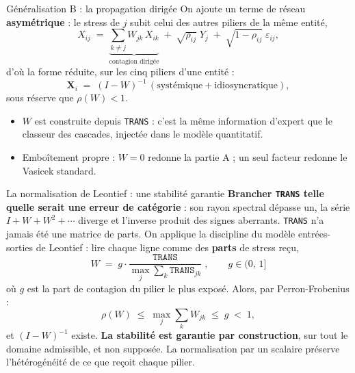 \documentclass[11pt]{beamer}
\begin{document}
\begin{frame}{Généralisation B : la propagation dirigée}
On ajoute un terme de réseau \textbf{asymétrique} : le stress de $j$ subit celui des
autres piliers de la même entité,
\[
X_{ij} \;=\; \underbrace{\sum_{k\neq j} W_{jk}\,X_{ik}}_{\text{contagion dirigée}}
   \;+\; \sqrt{\rho_{ij}}\;Y_j \;+\; \sqrt{1-\rho_{ij}}\;\varepsilon_{ij},
\]
d'où la forme réduite, sur les cinq piliers d'une entité :
\[
\mathbf{X}_i \;=\; (I-W)^{-1}\,(\text{systémique} + \text{idiosyncratique}),
\]
sous réserve que $\rho(W) < 1$.
\begin{itemize}
\item $W$ est construite depuis \texttt{TRANS} : c'est la même information d'expert que
      le classeur des cascades, injectée dans le modèle quantitatif.
\item Emboîtement propre : $W = 0$ redonne la partie A ; un seul facteur redonne le
      Vasicek standard.
\end{itemize}
\end{frame}

\begin{frame}{La normalisation de Leontief : une stabilité garantie}
\textbf{Brancher \texttt{TRANS} telle quelle serait une erreur de catégorie} : son rayon
spectral dépasse un, la série $I + W + W^2 + \cdots$ diverge et l'inverse produit des
signes aberrants. \texttt{TRANS} n'a jamais été une matrice de parts.
\medskip
On applique la discipline du modèle entrées-sorties de Leontief : lire chaque ligne comme
des \textbf{parts} de stress reçu,
\[
\boxed{\;W \;=\; g \cdot \frac{\texttt{TRANS}}{\max_j \sum_k \texttt{TRANS}_{jk}}\;,
\qquad g \in (0,\,1]\;}
\]
où $g$ est la part de contagion du pilier le plus exposé. Alors, par Perron-Frobenius :
\[
\rho(W) \;\le\; \max_j \sum_k W_{jk} \;\le\; g \;<\; 1,
\]
et $(I-W)^{-1}$ existe. \textbf{La stabilité est garantie par construction}, sur tout le
domaine admissible, et non supposée. La normalisation par un scalaire préserve
l'hétérogénéité de ce que reçoit chaque pilier.
\end{frame}
\end{document}
